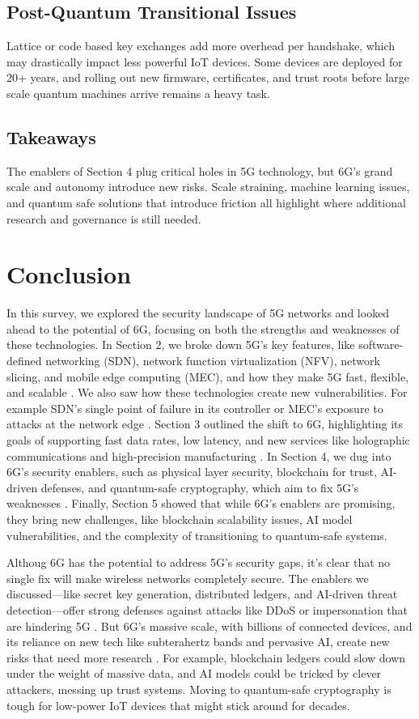 \documentclass[acmtog]{acmart}
\begin{document}
\subsection{Post-Quantum Transitional Issues}
Lattice or code based key exchanges add more overhead per handshake, which may drastically impact less powerful IoT devices. Some devices are deployed for 20+ years, and rolling out new firmware, certificates, and trust roots before large scale quantum machines arrive remains a heavy task.

\subsection{Takeaways}
The enablers of Section 4 plug critical holes in 5G technology, but 6G's grand scale and autonomy introduce new risks. Scale straining, machine learning issues, and quantum safe solutions that introduce friction all highlight where additional research and governance is still needed.

\section{Conclusion}

In this survey, we explored the security landscape of 5G networks and looked ahead to the potential of 6G, focusing on both the strengths and weaknesses of these technologies. In Section 2, we broke down 5G’s key features, like software-defined networking (SDN), network function virtualization (NFV), network slicing, and mobile edge computing (MEC), and how they make 5G fast, flexible, and scalable \cite{ref6}. We also saw how these technologies create new vulnerabilities. For example SDN’s single point of failure in its controller or MEC’s exposure to attacks at the network edge \cite{ref3}. Section 3 outlined the shift to 6G, highlighting its goals of supporting fast data rates, low latency, and new services like holographic communications and high-precision manufacturing \cite{ref4}. In Section 4, we dug into 6G’s security enablers, such as physical layer security, blockchain for trust, AI-driven defenses, and quantum-safe cryptography, which aim to fix 5G’s weaknesses \cite{ref1,ref2,ref5,ref8}. Finally, Section 5 showed that while 6G’s enablers are promising, they bring new challenges, like blockchain scalability issues, AI model vulnerabilities, and the complexity of transitioning to quantum-safe systems.

Althoug 6G has the potential to address 5G’s security gaps, it’s clear that no single fix will make wireless networks completely secure. The enablers we discussed—like secret key generation, distributed ledgers, and AI-driven threat detection—offer strong defenses against attacks like DDoS or impersonation that are hindering 5G \cite{ref1,ref2,ref5}. But 6G’s massive scale, with billions of connected devices, and its reliance on new tech like subterahertz bands and pervasive AI, create new risks that need more research \cite{ref4}. For example, blockchain ledgers could slow down under the weight of massive data, and AI models could be tricked by clever attackers, messing up trust systems. Moving to quantum-safe cryptography is tough for low-power IoT devices that might stick around for decades.
\end{document}
